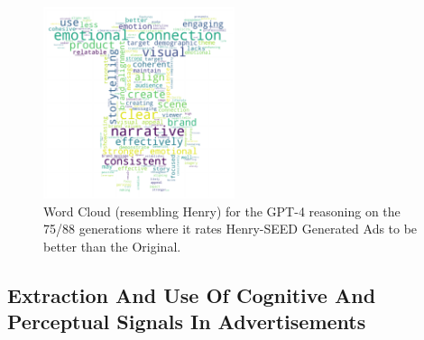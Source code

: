 \begin{figure}
    \centering
    \includegraphics[width=0.5\textwidth]{images/henry/wordcloud_henry_win.pdf}
    \caption{Word Cloud (resembling Henry) for the GPT-4 reasoning on the 75/88 generations where it rates Henry-SEED Generated Ads to be better than the Original.}
    \label{fig:gpt4-henry-win-wordcloud}
\end{figure}


\FloatBarrier
\subsection{Extraction And Use Of Cognitive And Perceptual Signals In Advertisements}


